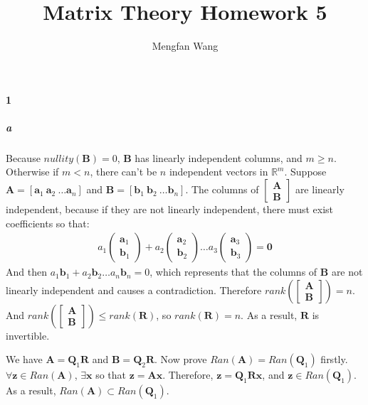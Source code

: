 \documentclass[22pt]{article}
\author{Mengfan Wang}
\title{Matrix Theory Homework 5}
\begin{document}
	\maketitle 
	\paragraph{1} 
	\subparagraph{a} Because $nullity(\mathbf{B}) = 0$, $\mathbf{B}$ has linearly independent columns, and $m\geq n$. Otherwise if $m<n$, there can't be $n$ independent vectors in $\mathbb{R}^m$. Suppose $\mathbf{A} = [\mathbf{a}_1\ \mathbf{a}_2\ \dots \mathbf{a}_n]$ and $\mathbf{B} = [\mathbf{b}_1\ \mathbf{b}_2\ \dots \mathbf{b}_n]$. The columns of $\left[\begin{array}{c} \mathbf{A} \\ \mathbf{B} \end{array}\right]$ are linearly independent, because if they are not linearly independent, there must exist coefficients so that:
	\begin{align}
		a_1\left(\begin{array}{c} \mathbf{a}_1 \\ \mathbf{b}_1 \end{array}\right) + a_2 \left(\begin{array}{c} \mathbf{a}_2 \\ \mathbf{b}_2 \end{array}\right) \dots a_3\left(\begin{array}{c} \mathbf{a}_3 \\ \mathbf{b}_3 \end{array}\right) = \mathbf{0}
	\end{align}
	And then $a_1\mathbf{b}_1+ a_2\mathbf{b}_2 \dots a_n\mathbf{b}_n=0$, which represents that the columns of $\mathbf{B}$ are not linearly independent and causes a contradiction. Therefore $rank(\left[\begin{array}{c} \mathbf{A} \\ \mathbf{B} \end{array}\right]) = n$. And $rank(\left[\begin{array}{c} \mathbf{A} \\ \mathbf{B} \end{array}\right]) \leq rank(\mathbf{R})$, so $rank(\mathbf{R})=n$. As a result, $\mathbf{R}$ is invertible. 


	We have $\mathbf{A} = \mathbf{Q}_1\mathbf{R}$ and $\mathbf{B} = \mathbf{Q}_2\mathbf{R}$. Now prove $Ran(\mathbf{A}) = Ran(\mathbf{Q}_1) $ firstly. $\forall \mathbf{z} \in Ran(\mathbf{A})$, $\exists \mathbf{x}$ so that $\mathbf{z} = \mathbf{Ax}$. Therefore, $\mathbf{z} = \mathbf{Q}_1\mathbf{Rx}$, and $\mathbf{z}\in Ran(\mathbf{Q}_1)$. As a result, $Ran(\mathbf{A}) \subset Ran(\mathbf{Q}_1)$. 
\end{document}
